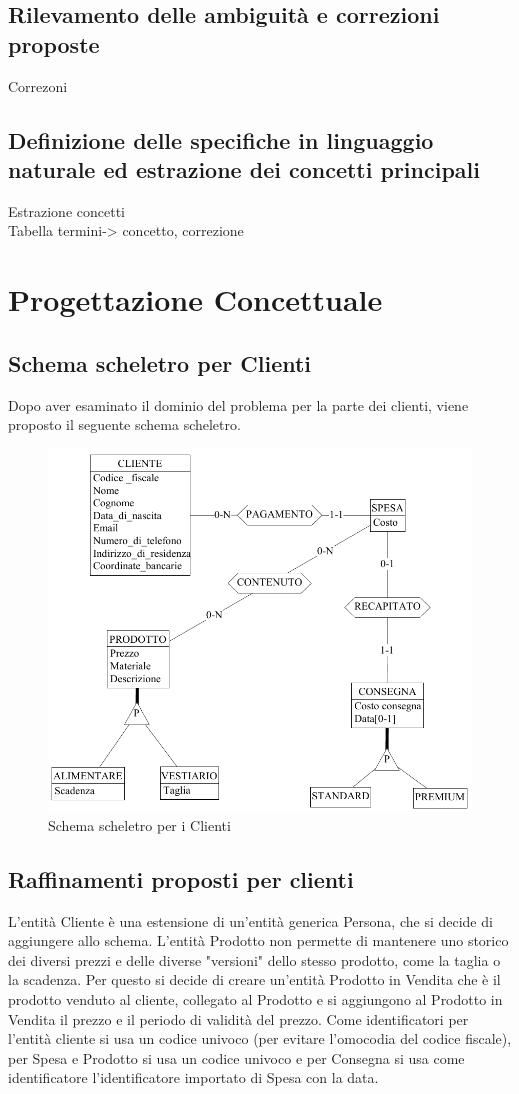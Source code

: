 \documentclass[a4paper,12pt]{report}
\begin{document}
\section{Rilevamento delle ambiguità e correzioni proposte}
Correzoni
\section{Definizione delle specifiche in linguaggio naturale ed estrazione dei concetti principali}
Estrazione concetti\\
Tabella termini-> concetto, correzione

\chapter{Progettazione Concettuale}
\section{Schema scheletro per Clienti}
Dopo aver esaminato il dominio del problema per la parte dei clienti, viene proposto il seguente schema scheletro.
\begin{figure}[h]
	\centering{}
	\includegraphics[width=\textwidth]{img/SchemaConcettuale-Clienti1.pdf}
	\caption{Schema scheletro per i Clienti}
\end{figure}
\section{Raffinamenti proposti per clienti}
L'entità Cliente è una estensione di un'entità generica Persona, che si decide di aggiungere allo schema. 
L'entità Prodotto non permette di mantenere uno storico dei diversi prezzi e delle diverse "versioni" dello stesso prodotto, come la taglia o la scadenza. 
Per questo si decide di creare un'entità Prodotto in Vendita che è il prodotto venduto al cliente, collegato al Prodotto e si aggiungono al Prodotto in Vendita il prezzo e il periodo di validità del prezzo. 
Come identificatori per l'entità cliente si usa un codice univoco (per evitare l'omocodia del codice fiscale), per Spesa e Prodotto si usa un codice univoco e per Consegna si usa come identificatore 
l'identificatore importato di Spesa con la data.
\end{document}
